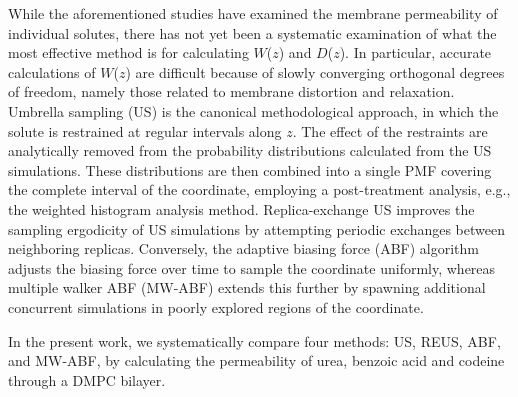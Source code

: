 \par While the aforementioned studies have examined the membrane permeability of individual solutes, there has not yet been a systematic examination of what the most effective method is for calculating $W$($z$) and $D$($z$). In particular, accurate calculations of $W$($z$) are difficult because of slowly converging orthogonal degrees of freedom, namely those related to membrane distortion and relaxation\cite{Neale2011,Neale2014}. Umbrella sampling (US) is the canonical methodological approach, in which the solute is restrained at regular intervals along $z$. The effect of the restraints are analytically removed from the probability distributions calculated from the US simulations. These distributions are then combined into a single PMF covering the complete interval of the coordinate, employing a post-treatment analysis, e.g., the weighted histogram analysis method.  Replica-exchange US improves the sampling ergodicity of US simulations by attempting periodic exchanges between neighboring replicas. Conversely, the adaptive biasing force (ABF) algorithm adjusts the biasing force over time to sample the coordinate uniformly, whereas multiple walker ABF (MW-ABF) extends this further by spawning additional concurrent simulations in poorly explored regions of the coordinate.

\par In the present work, we systematically compare four methods: US, REUS, ABF, and MW-ABF, by calculating the permeability of urea, benzoic acid and codeine through a DMPC bilayer.
